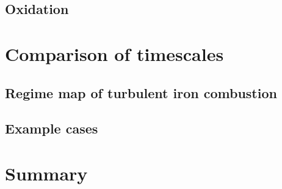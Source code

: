 \subsection{Oxidation}

\section{Comparison of timescales}

\subsection{Regime map of turbulent iron combustion}

\subsection{Example cases}

\section{Summary}